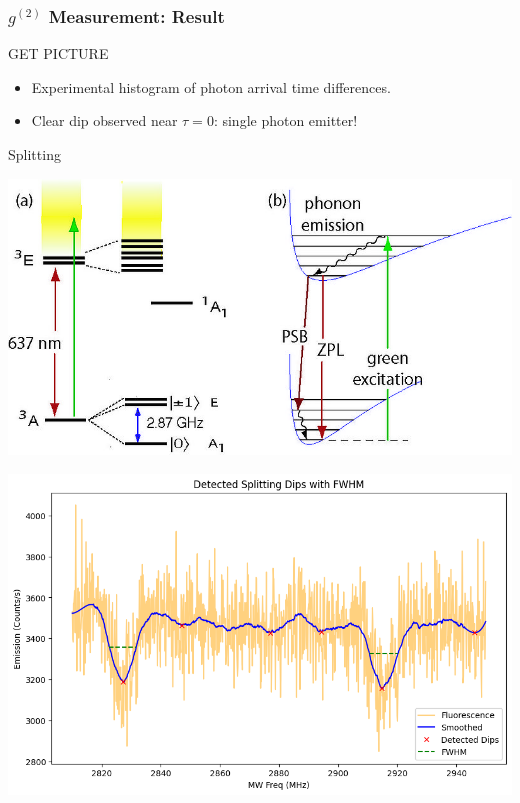 \documentclass{beamer}
\begin{document}
\begin{frame}
\frametitle{$g^{(2)}$ Measurement: Result}
GET PICTURE
\begin{itemize}
    \item Experimental histogram of photon arrival time differences.
    \item Clear dip observed near $\tau = 0$: single photon emitter!
\end{itemize}
\end{frame}
\begin{frame}{Splitting}
    \begin{minipage}{0.5\textwidth}
        \centering
        \includegraphics[width=\linewidth]{presentation/figs/Nv_structure.jpg} \\
        {\small }
    \end{minipage}
    \begin{minipage}{0.48\textwidth}
        \centering
        \includegraphics[width=\linewidth]{presentation/figs/dips.png}

\end{minipage}
\end{frame}
\end{document}
